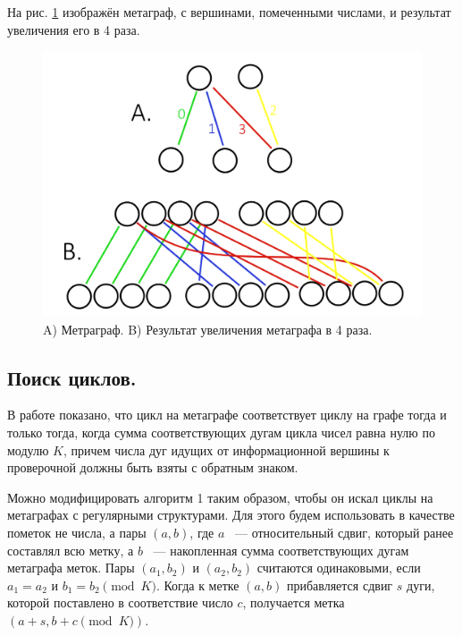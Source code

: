 \documentclass[14pt]{mmcs_article}
\begin{document}
На рис. \ref{stud:metagraph:1} изображён метаграф, с вершинами, помеченными числами, и результат увеличения его в 4 раза.

\begin{figure}[H]
  \centering
  \includegraphics[scale=0.5]{Fig_8.png}
  \caption{ A) Метраграф. B) Результат увеличения метаграфа в 4 раза. }
  \label{stud:metagraph:1}
\end{figure}

\subsection{Поиск циклов.}

В работе \cite{metagraphs} показано, что цикл на метаграфе соответствует циклу на графе тогда и только тогда, когда сумма соответствующих дугам цикла чисел равна нулю по модулю $K$, причем числа дуг идущих от информационной вершины к проверочной должны быть взяты с обратным знаком.

Можно модифицировать алгоритм 1 таким образом, чтобы он искал циклы на метаграфах с регулярными структурами. Для этого будем использовать в качестве пометок не числа, а пары $(a, b)$, где $a$ ~--- относительный сдвиг, который ранее составлял всю метку, а $b$ ~--- накопленная сумма соответствующих дугам метаграфа меток. Пары $(a_1, b_2)$ и $(a_2, b_2)$ считаются одинаковыми, если $a_1 = a_2$ и $b_1 = b_2 \pmod K$. Когда к метке $(a, b)$ прибавляется сдвиг $s$ дуги, которой поставлено в соответствие число $c$, получается метка $(a + s, b + c \pmod K)$.
\end{document}
